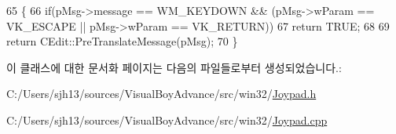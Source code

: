 \begin{DoxyCode}
65 \{
66   \textcolor{keywordflow}{if}(pMsg->message == WM\_KEYDOWN && (pMsg->wParam == VK\_ESCAPE || pMsg->wParam == VK\_RETURN))
67     \textcolor{keywordflow}{return} TRUE;
68 
69   \textcolor{keywordflow}{return} CEdit::PreTranslateMessage(pMsg);
70 \}
\end{DoxyCode}


이 클래스에 대한 문서화 페이지는 다음의 파일들로부터 생성되었습니다.\+:\begin{DoxyCompactItemize}
\item 
C\+:/\+Users/sjh13/sources/\+Visual\+Boy\+Advance/src/win32/\mbox{\hyperlink{_joypad_8h}{Joypad.\+h}}\item 
C\+:/\+Users/sjh13/sources/\+Visual\+Boy\+Advance/src/win32/\mbox{\hyperlink{_joypad_8cpp}{Joypad.\+cpp}}\end{DoxyCompactItemize}
